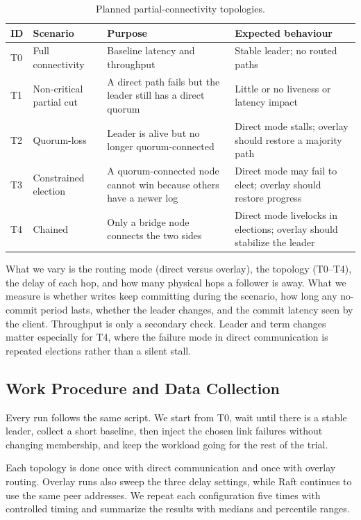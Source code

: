 \documentclass[11pt,a4paper]{article}
\begin{document}
\begin{table}[h]
  \centering
  \small
  \begin{tabular}{p{0.6cm}p{3.4cm}p{4.4cm}p{4.3cm}}
    \hline
    ID & Scenario & Purpose & Expected behaviour \\
    \hline
    T0 & Full connectivity & Baseline latency and throughput & Stable leader; no routed paths \\
    T1 & Non-critical partial cut & A direct path fails but the leader still has a direct quorum & Little or no liveness or latency impact \\
    T2 & Quorum-loss & Leader is alive but no longer quorum-connected & Direct mode stalls; overlay should restore a majority path \\
    T3 & Constrained election & A quorum-connected node cannot win because others have a newer log & Direct mode may fail to elect; overlay should restore progress \\
    T4 & Chained & Only a bridge node connects the two sides & Direct mode livelocks in elections; overlay should stabilize the leader \\
    \hline
  \end{tabular}
  \caption{Planned partial-connectivity topologies.}
  \label{tab:topologies}
\end{table}

What we vary is the routing mode (direct versus overlay), the topology (T0--T4), the delay of each hop, and how many physical hops a follower is away. What we measure is whether writes keep committing during the scenario, how long any no-commit period lasts, whether the leader changes, and the commit latency seen by the client. Throughput is only a secondary check. Leader and term changes matter especially for T4, where the failure mode in direct communication is repeated elections rather than a silent stall.

\subsection{Work Procedure and Data Collection}

Every run follows the same script. We start from T0, wait until there is a stable leader, collect a short baseline, then inject the chosen link failures without changing membership, and keep the workload going for the rest of the trial. 

Each topology is done once with direct communication and once with overlay routing. Overlay runs also sweep the three delay settings, while Raft continues to use the same peer addresses. We repeat each configuration five times with controlled timing and summarize the results with medians and percentile ranges.
\end{document}
